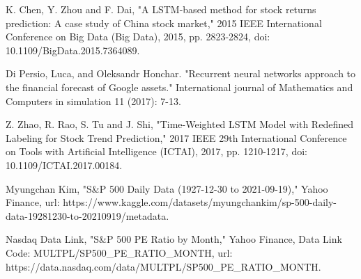 \documentclass{article}
\begin{document}
\begin{thebibliography}{9}
K. Chen, Y. Zhou and F. Dai, "A LSTM-based method for stock returns prediction: A case study of China stock market," 2015 IEEE International Conference on Big Data (Big Data), 2015, pp. 2823-2824, doi: 10.1109/BigData.2015.7364089.

Di Persio, Luca, and Oleksandr Honchar. "Recurrent neural networks approach to the financial forecast of Google assets." International journal of Mathematics and Computers in simulation 11 (2017): 7-13.

Z. Zhao, R. Rao, S. Tu and J. Shi, "Time-Weighted LSTM Model with Redefined Labeling for Stock Trend Prediction," 2017 IEEE 29th International Conference on Tools with Artificial Intelligence (ICTAI), 2017, pp. 1210-1217, doi: 10.1109/ICTAI.2017.00184.

Myungchan Kim, "S\&P 500 Daily Data (1927-12-30 to 2021-09-19)," Yahoo Finance, url: https://www.kaggle.com/datasets/myungchankim/sp-500-daily-data-19281230-to-20210919/metadata.

Nasdaq Data Link, "S\&P 500 PE Ratio by Month," Yahoo Finance, Data Link Code: MULTPL/SP500\_PE\_RATIO\_MONTH, url: https://data.nasdaq.com/data/MULTPL/SP500\_PE\_RATIO\_MONTH.

\end{thebibliography}
\end{document}
